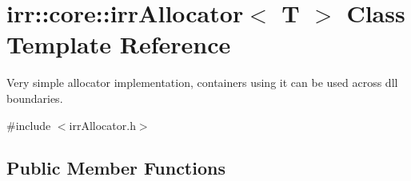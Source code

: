 \hypertarget{classirr_1_1core_1_1irrAllocator}{}\section{irr\+:\+:core\+:\+:irr\+Allocator$<$ T $>$ Class Template Reference}
\label{classirr_1_1core_1_1irrAllocator}


Very simple allocator implementation, containers using it can be used across dll boundaries.  




{\ttfamily \#include $<$irr\+Allocator.\+h$>$}

\subsection*{Public Member Functions}

